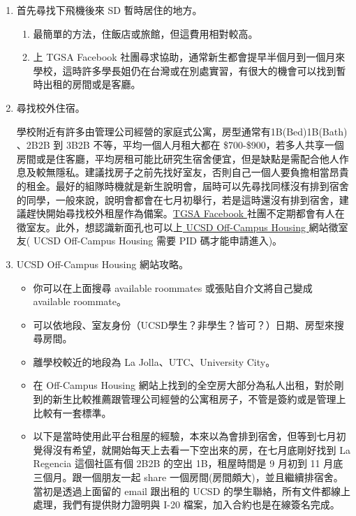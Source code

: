 \documentclass[10pt,a4paper]{book}
\begin{document}
\begin{CJK}{UTF8}{bkai}
\begin{enumerate}
\item 首先尋找下飛機後來 SD 暫時居住的地方。
    \begin{enumerate}
    \item 最簡單的方法，住飯店或旅館，但這費用相對較高。
    \item 上 TGSA Facebook 社團尋求協助，通常新生都會提早半個月到一個月來學校，這時許多學長姐仍在台灣或在別處實習，有很大的機會可以找到暫時出租的房間或是客廳。
    \end{enumerate}

\item 尋找校外住宿。

學校附近有許多由管理公司經營的家庭式公寓，房型通常有1B(Bed)1B(Bath) 、2B2B 到 3B2B 不等，平均一個人月租大都在 \$700-\$900，若多人共享一個房間或是住客廳，平均房租可能比研究生宿舍便宜，但是缺點是需配合他人作息及較無隱私。建議找房子之前先找好室友，否則自己一個人要負擔相當昂貴的租金。最好的組隊時機就是新生說明會，屆時可以先尋找同樣沒有排到宿舍的同學，一般來說，說明會都會在七月初舉行，若是這時還沒有排到宿舍，建議趕快開始尋找校外租屋作為備案。\href{https://www.facebook.com/groups/13591139149/}{TGSA Facebook }社團不定期都會有人在徵室友。此外，想認識新面孔也可以上\href{https://offcampushousing.ucsd.edu/}{ UCSD Off-Campus Housing }網站徵室友( UCSD Off-Campus Housing 需要 PID 碼才能申請進入)。

\item UCSD Off-Campus Housing 網站攻略。
    \begin{itemize}
    \item 你可以在上面搜尋 available roommates 或張貼自介文將自己變成 available roommate。
    \item 可以依地段、室友身份（UCSD學生？非學生？皆可？）日期、房型來搜尋房間。
    \item 離學校較近的地段為 La Jolla、UTC、University City。
    \item 在 Off-Campus Housing 網站上找到的全空房大部分為私人出租，對於剛到的新生比較推薦跟管理公司經營的公寓租房子，不管是簽約或是管理上比較有一套標準。
    \item 以下是當時使用此平台租屋的經驗，本來以為會排到宿舍，但等到七月初覺得沒有希望，就開始每天上去看一下空出來的房，在七月底剛好找到 La Regencia 這個社區有個 2B2B 的空出 1B，租屋時間是 9 月初到 11 月底三個月。跟一個朋友一起 share 一個房間(房間頗大)，並且繼續排宿舍。當初是透過上面留的 email 跟出租的 UCSD 的學生聯絡，所有文件都線上處理，我們有提供財力證明與 I-20 檔案，加入合約也是在線簽名完成。
    \end{itemize}
    

\end{enumerate}
\end{CJK}
\end{document}
